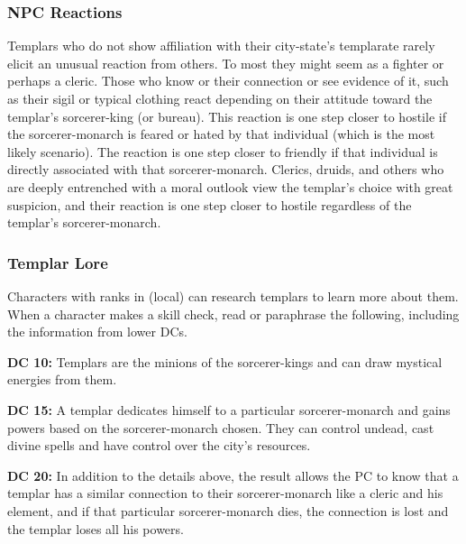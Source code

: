 \subsubsection{NPC Reactions}
Templars who do not show affiliation with their city-state's templarate rarely elicit an unusual reaction from others. To most they might seem as a fighter or perhaps a cleric. Those who know or their connection or see evidence of it, such as their sigil or typical clothing react depending on their attitude toward the templar's sorcerer-king (or bureau). This reaction is one step closer to hostile if the sorcerer-monarch is feared or hated by that individual (which is the most likely scenario). The reaction is one step closer to friendly if that individual is directly associated with that sorcerer-monarch. Clerics, druids, and others who are deeply entrenched with a moral outlook view the templar's choice with great suspicion, and their reaction is one step closer to hostile regardless of the templar's sorcerer-monarch.

\subsubsection{Templar Lore}
Characters with ranks in  (local) can research templars to learn more about them. When a character makes a skill check, read or paraphrase the following, including the information from lower DCs.

\textbf{DC 10:} Templars are the minions of the sorcerer-kings and can draw mystical energies from them.

\textbf{DC 15:} A templar dedicates himself to a particular sorcerer-monarch and gains powers based on the sorcerer-monarch chosen. They can control undead, cast divine spells and have control over the city's resources.

\textbf{DC 20:} In addition to the details above, the result allows the PC to know that a templar has a similar connection to their sorcerer-monarch like a cleric and his element, and if that particular sorcerer-monarch dies, the connection is lost and the templar loses all his powers.
